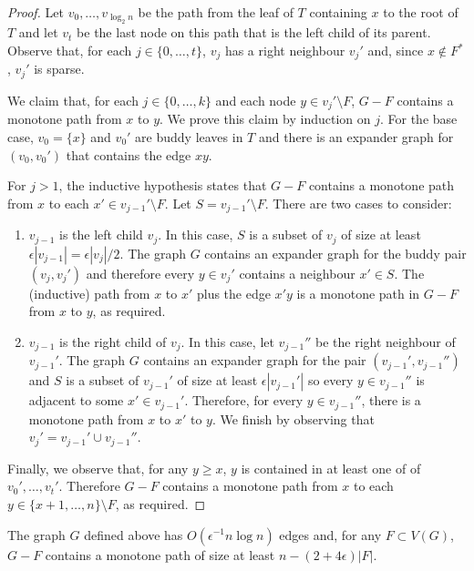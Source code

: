 \documentclass{patmorin}
\begin{document}
\begin{proof}
  Let $v_0,\ldots,v_{\log_2 n}$ be the path from the leaf of $T$
  containing $x$ to the root of $T$ and let $v_t$ be the last node on
  this path that is the left child of its parent.  Observe that, for
  each $j\in\{0,\ldots,t\}$, $v_j$ has a right neighbour $v_j'$ and,
  since $x\not\in F^*$, $v_j'$ is sparse.

  We claim that, for each $j\in\{0,\ldots,k\}$ and each node $y\in
  v_j'\setminus F$, $G-F$ contains a monotone path from $x$ to $y$.
  We prove this claim by induction on $j$.  For the base case, $v_0=\{x\}$
  and $v_0'$ are buddy leaves in $T$ and there is an expander graph
  for $(v_0,v_0')$
  that contains the edge $xy$.

  For $j>1$, the inductive hypothesis states that $G-F$ contains
  a monotone path from $x$ to each $x'\in v_{j-1}'\setminus F$.
  Let $S=v_{j-1}'\setminus F$.  There are two cases to consider:
  \begin{enumerate}
    \item $v_{j-1}$ is the left child $v_{j}$.  In this case,
	  $S$ is a subset of $v_j$ of size at least $\epsilon|v_{j-1}|
	  = \epsilon|v_j|/2$.  The graph $G$ contains an expander graph
	  for the buddy pair $(v_j,v_j')$ and therefore every $y\in v_j'$
	  contains a neighbour $x'\in S$.  The (inductive) path from
	  $x$ to $x'$ plus the edge $x'y$ is a monotone path in $G-F$
	  from $x$ to $y$, as required.

    \item $v_{j-1}$ is the right child of $v_j$.	In this case, let
	  $v_{j-1}''$ be the right neighbour of $v_{j-1}'$.
	  The graph $G$ contains an expander graph for the pair
	  $(v_{j-1}',v_{j-1}'')$ and $S$ is a subset of $v_{j-1}'$ of
	  size at least $\epsilon|v_{j-1}'|$ so every $y\in v_{j-1}''$ is
	  adjacent to some $x'\in v_{j-1}'$.  Therefore, for every $y\in
	  v_{j-1}''$, there is a monotone path from $x$ to $x'$ to $y$.
	  We finish by observing that $v_j' = v_{j-1}'\cup v_{j-1}''$.
  \end{enumerate}
  Finally, we observe that, for any $y\ge x$, $y$ is contained in at least one of of $v_0',\ldots,v_t'$.  Therefore $G-F$ contains a monotone path from $x$ to each $y\in\{x+1,\ldots,n\}\setminus F$, as required.
\end{proof}

\begin{prop}
  The graph $G$ defined above has $O(\epsilon^{-1}n\log n)$ edges
  and, for any $F\subset V(G)$, $G-F$ contains a monotone path of
  size at least $n-(2+4\epsilon)|F|$.
\end{prop}
\end{document}
